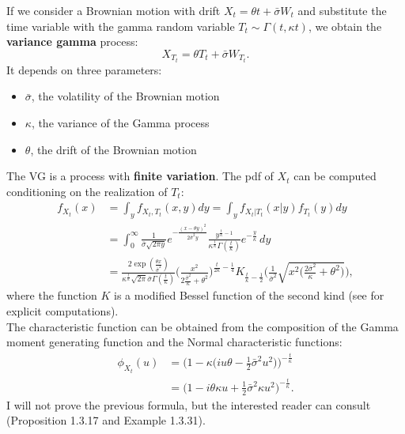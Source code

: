 \documentclass[a4paper,10pt]{article}
\begin{document}
If we consider a Brownian motion with drift $X_t = \theta t + \bar\sigma W_t$ and substitute the time variable with the gamma random variable
$T_t \sim \Gamma(t,\kappa t)$,
we obtain the \textbf{variance gamma} process:
\begin{equation}\label{VG_process}
 X_{T_t} = \theta T_t + \bar\sigma W_{T_t} .
\end{equation}
It depends on three parameters:
\begin{itemize}
 \item $\bar\sigma$, the volatility of the Brownian motion
 \item $\kappa$, the variance of the Gamma process
 \item $\theta$, the drift of the Brownian motion
\end{itemize}
The VG is a process with \textbf{finite variation}. 
The pdf of $X_t$ can be computed conditioning on the realization of $T_t$:
\begin{align}\label{VG_density}
 f_{X_t}(x) &= \int_y f_{X_t,T_t}(x,y) dy = \int_y f_{X_t|T_t}(x|y) f_{T_t}(y) dy \\ \nonumber
         &= \int_0^{\infty} \frac{1}{\bar\sigma \sqrt{2\pi y}} e^{-\frac{(x -\theta y)^2}{2\bar\sigma^2 y}}
         \frac{y^{\frac{t}{\kappa} -1}}{\kappa^{\frac{t}{\kappa}} \Gamma(\frac{t}{\kappa})}
          e^{-\frac{y}{\kappa}} \, dy \\ \nonumber
         &= \frac{2 \exp(\frac{\theta x}{\bar\sigma^2})}{\kappa^{\frac{t}{\kappa}} \sqrt{2\pi}\bar\sigma \Gamma(\frac{t}{\kappa}) }
            \biggl( \frac{x^2}{2\frac{\bar\sigma^2}{\kappa} + \theta^2} \biggr)^{\frac{t}{2\kappa}-\frac{1}{4}} 
            K_{\frac{t}{\kappa}-\frac{1}{2}} 
            \biggl( \frac{1}{\bar\sigma^2} \sqrt{x^2 \bigl(\frac{2\bar\sigma^2}{\kappa}+\theta^2 \bigr)} \biggr),
\end{align}
where the function $K$ is a modified Bessel function of the second kind (see \cite{MCC98} for explicit computations).\\
The characteristic function can be obtained from the composition of the Gamma moment generating function and the Normal characteristic functions: 
\begin{align*}
 \phi_{X_t}(u) &= \biggl( 1- \kappa \bigl( i u\theta -\frac{1}{2}\bar\sigma^2 u^2 \bigr) \biggr)^{-\frac{t}{\kappa}} \\  
	       &= \biggl( 1-i\theta \kappa u + \frac{1}{2} \bar\sigma^2 \kappa u^2 \biggr)^{-\frac{t}{\kappa}}.
\end{align*}
I will not prove the previous formula, but the interested reader can consult \cite{Applebaum} (Proposition 1.3.17 and Example 1.3.31).\\
\end{document}
